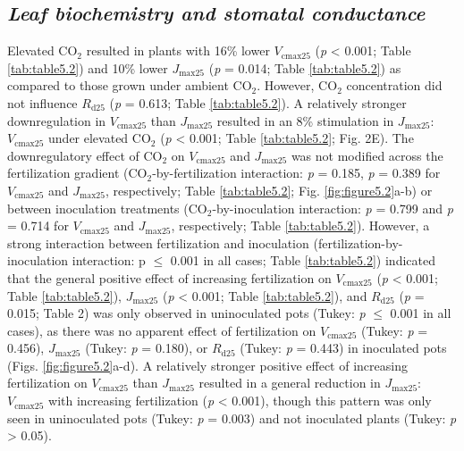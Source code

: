 \subsection{\textit{Leaf biochemistry and stomatal conductance}}
Elevated CO$_2$ resulted in plants with 16\% lower $V_\mathrm{cmax25}$ (\textit{p} < 0.001; Table \ref{tab:table5.2}) and 10\% lower $J_\mathrm{max25}$ (\textit{p} = 0.014; Table \ref{tab:table5.2}) as compared to those grown under ambient CO$_2$. However, CO$_2$ concentration did not influence $R_\mathrm{d25}$ (\textit{p} = 0.613; Table \ref{tab:table5.2}). A relatively stronger downregulation in $V_\mathrm{cmax25}$ than $J_\mathrm{max25}$ resulted in an 8\% stimulation in $J_\mathrm{max25}$:$V_\mathrm{cmax25}$ under elevated CO$_2$ (\textit{p} < 0.001; Table \ref{tab:table5.2}; Fig. 2E). The downregulatory effect of CO$_2$ on $V_\mathrm{cmax25}$ and $J_\mathrm{max25}$ was not modified across the fertilization gradient (CO$_2$-by-fertilization interaction: \textit{p} = 0.185, \textit{p} = 0.389 for $V_\mathrm{cmax25}$ and $J_\mathrm{max25}$, respectively; Table \ref{tab:table5.2}; Fig. \ref{fig:figure5.2}a-b) or between inoculation treatments (CO$_2$-by-inoculation interaction: \textit{p} = 0.799 and \textit{p} = 0.714 for $V_\mathrm{cmax25}$ and $J_\mathrm{max25}$, respectively; Table \ref{tab:table5.2}). However, a strong interaction between fertilization and inoculation (fertilization-by-inoculation interaction: p $\le$ 0.001 in all cases; Table \ref{tab:table5.2}) indicated that the general positive effect of increasing fertilization on $V_\mathrm{cmax25}$ (\textit{p} < 0.001; Table \ref{tab:table5.2}), $J_\mathrm{max25}$ (\textit{p} < 0.001; Table \ref{tab:table5.2}), and $R_\mathrm{d25}$ (\textit{p} = 0.015; Table 2) was only observed in uninoculated pots (Tukey: \textit{p} $\le$ 0.001 in all cases), as there was no apparent effect of fertilization on $V_\mathrm{cmax25}$ (Tukey: \textit{p} = 0.456), $J_\mathrm{max25}$ (Tukey: \textit{p} = 0.180), or $R_\mathrm{d25}$ (Tukey: \textit{p} = 0.443) in inoculated pots (Figs. \ref{fig:figure5.2}a-d). A relatively stronger positive effect of increasing fertilization on $V_\mathrm{cmax25}$ than $J_\mathrm{max25}$ resulted in a general reduction in $J_\mathrm{max25}$:$V_\mathrm{cmax25}$ with increasing fertilization (\textit{p} < 0.001), though this pattern was only seen in uninoculated pots (Tukey: \textit{p} = 0.003) and not inoculated plants (Tukey: \textit{p} > 0.05).

